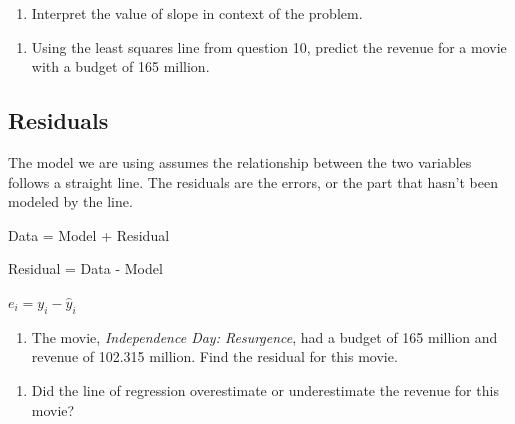 \documentclass[
]{report}
\providecommand{\tightlist}{%
  \setlength{\itemsep}{0pt}\setlength{\parskip}{0pt}}
\begin{document}
\vspace{.6in}

\begin{enumerate}
\def\labelenumi{\arabic{enumi}.}
\setcounter{enumi}{10}
\tightlist
\item
  Interpret the value of slope in context of the problem.
\end{enumerate}

\vspace{1in}

\begin{enumerate}
\def\labelenumi{\arabic{enumi}.}
\setcounter{enumi}{11}
\tightlist
\item
  Using the least squares line from question 10, predict the revenue for a movie with a budget of 165 million.
\end{enumerate}

\vspace{.6in}

\hypertarget{residuals}{%
\subsection*{Residuals}\label{residuals}}

The model we are using assumes the relationship between the two variables follows a straight line. The residuals are the errors, or the part that hasn't been modeled by the line.

\begin{center}
Data = Model + Residual

Residual = Data - Model

$e_i=y_i-\hat{y}_i$
\end{center}

\begin{enumerate}
\def\labelenumi{\arabic{enumi}.}
\setcounter{enumi}{12}
\tightlist
\item
  The movie, \emph{Independence Day: Resurgence}, had a budget of 165 million and revenue of 102.315 million. Find the residual for this movie.
\end{enumerate}

\vspace{.8in}

\begin{enumerate}
\def\labelenumi{\arabic{enumi}.}
\setcounter{enumi}{13}
\tightlist
\item
  Did the line of regression overestimate or underestimate the revenue for this movie?
\end{enumerate}
\end{document}
